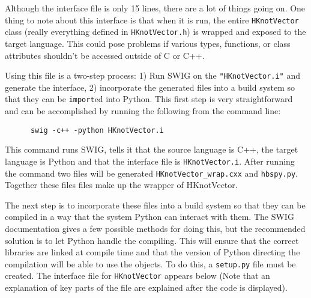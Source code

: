     \noindent Although the interface file is only 15 lines, there are a lot of things going on. One thing to note about this interface is that when it is run, the entire \texttt{HKnotVector} class (really everything defined in \texttt{HKnotVector.h}) is wrapped and exposed to the target language. This could pose problems if various types, functions, or class attributes shouldn't be accessed outside of C or C++.

    Using this file is a two-step process: 1) Run SWIG on the \texttt{"HKnotVector.i"} and generate the interface, 2) incorporate the generated files into a build system so that they can be \texttt{import}ed into Python. This first step is very straightforward and can be accomplished by running the following from the command line:

    \vspace{.2in}
    \begin{lstlisting}
      swig -c++ -python HKnotVector.i
    \end{lstlisting}
    \mainstretch{}

    \noindent This command runs SWIG, tells it that the source language is C++, the target language is Python and that the interface file is \texttt{HKnotVector.i}. After running the command two files will be generated \texttt{HKnotVector\_wrap.cxx} and \texttt{hbspy.py}. Together these files files make up the wrapper of HKnotVector.

    The next step is to incorporate these files into a build system so that they can be compiled in a way that the system Python can interact with them. The SWIG documentation gives a few possible methods for doing this, but the recommended solution is to let Python handle the compiling. This will ensure that the correct libraries are linked at compile time and that the version of Python directing the compilation will be able to use the objects. To do this, a \texttt{setup.py} file must be created. The interface file for \texttt{HKnotVector} appears below (Note that an explanation of key parts of the file are explained after the code is displayed).

    \vspace{.2in}
    

